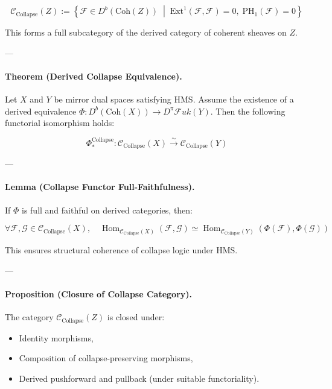 \documentclass[11pt]{article}
\begin{document}
\begin{axiom}
\begin{axiom}
{{\[
\mathcal{C}_{\text{Collapse}}(Z) := \left\{
  \mathcal{F} \in D^b(\mathrm{Coh}(Z)) \;\middle|\;
  \mathrm{Ext}^1(\mathcal{F}, \mathcal{F}) = 0,\; \mathrm{PH}_1(\mathcal{F}) = 0
\right\}
\]

This forms a full subcategory of the derived category of coherent sheaves on \( Z \).

---

\paragraph{Theorem (Derived Collapse Equivalence).}

Let \( X \) and \( Y \) be mirror dual spaces satisfying HMS.  
Assume the existence of a derived equivalence \( \Phi: D^b(\mathrm{Coh}(X)) \to D^\pi \mathcal{F}uk(Y) \).  
Then the following functorial isomorphism holds:

\[
\Phi_*^{\mathrm{Collapse}} : \mathcal{C}_{\text{Collapse}}(X) \xrightarrow{\sim} \mathcal{C}_{\text{Collapse}}(Y)
\]

---

\paragraph{Lemma (Collapse Functor Full-Faithfulness).}

If \( \Phi \) is full and faithful on derived categories, then:

\[
\forall \mathcal{F}, \mathcal{G} \in \mathcal{C}_{\text{Collapse}}(X), \quad
\operatorname{Hom}_{\mathcal{C}_{\text{Collapse}}(X)}(\mathcal{F}, \mathcal{G})
\simeq
\operatorname{Hom}_{\mathcal{C}_{\text{Collapse}}(Y)}(\Phi(\mathcal{F}), \Phi(\mathcal{G}))
\]

This ensures structural coherence of collapse logic under HMS.

---

\paragraph{Proposition (Closure of Collapse Category).}

The category \( \mathcal{C}_{\text{Collapse}}(Z) \) is closed under:
\begin{itemize}
  \item Identity morphisms,
  \item Composition of collapse-preserving morphisms,
  \item Derived pushforward and pullback (under suitable functoriality).
\end{itemize}

}}
\end{axiom}
\end{axiom}
\end{document}

